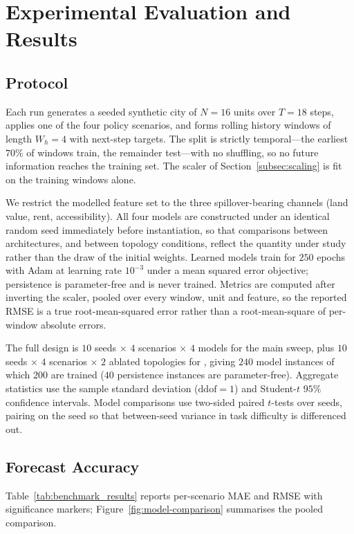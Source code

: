 \section{Experimental Evaluation and Results}
\label{sec:experiments}

\subsection{Protocol}

Each run generates a seeded synthetic city of $N = 16$ units over $T = 18$
steps, applies one of the four policy scenarios, and forms rolling history
windows of length $W_h = 4$ with next-step targets. The split is strictly
temporal---the earliest $70\%$ of windows train, the remainder test---with no
shuffling, so no future information reaches the training set. The scaler of
Section~\ref{subsec:scaling} is fit on the training windows alone.

We restrict the modelled feature set to the three spillover-bearing channels
(land value, rent, accessibility). All four models are constructed under an
identical random seed immediately before instantiation, so that comparisons
between architectures, and between topology conditions, reflect the quantity
under study rather than the draw of the initial weights. Learned models train
for $250$ epochs with Adam at learning rate $10^{-3}$ under a mean squared
error objective; persistence is parameter-free and is never trained. Metrics
are computed after inverting the scaler, pooled over every window, unit and
feature, so the reported RMSE is a true root-mean-squared error rather than a
root-mean-square of per-window absolute errors.

The full design is $10$ seeds $\times$ $4$ scenarios $\times$ $4$ models for
the main sweep, plus $10$ seeds $\times$ $4$ scenarios $\times$ $2$ ablated
topologies for \CGCEN{}, giving $240$ model instances of which $200$ are
trained ($40$ persistence instances are parameter-free). Aggregate statistics use
the sample standard deviation ($\mathrm{ddof} = 1$) and Student-$t$ $95\%$
confidence intervals. Model comparisons use two-sided paired $t$-tests over
seeds, pairing on the seed so that between-seed variance in task difficulty is
differenced out.

\subsection{Forecast Accuracy}

Table~\ref{tab:benchmark_results} reports per-scenario MAE and RMSE with
significance markers; Figure~\ref{fig:model-comparison} summarises the pooled
comparison.

